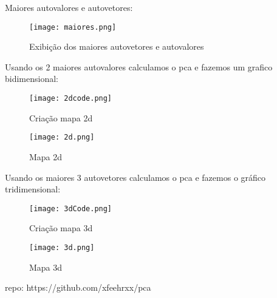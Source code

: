 \documentclass{article}
\begin{document}
Maiores autovalores e autovetores:

\begin{figure}[H]
    \centering
    \texttt{[image: maiores.png]}
    \caption{Exibição dos maiores autovetores e autovalores}
    \label{fig:autovalores}
\end{figure}

Usando os 2 maiores autovalores calculamos o pca e fazemos um grafico bidimensional:

\begin{figure}[H]
    \centering
    \texttt{[image: 2dcode.png]}
    \caption{Criação mapa 2d}
    \label{fig:autovalores}
\end{figure}

\begin{figure}[H]
    \centering
    \texttt{[image: 2d.png]}
    \caption{Mapa 2d}
    \label{fig:autovalores}
\end{figure}

Usando os maiores 3 autovetores calculamos o pca e fazemos o gráfico tridimensional: 

\begin{figure}[H]
    \centering
    \texttt{[image: 3dCode.png]}
    \caption{Criação mapa 3d}
    \label{fig:autovalores}
\end{figure}

\begin{figure}[H]
    \centering
    \texttt{[image: 3d.png]}
    \caption{Mapa 3d}
    \label{fig:autovalores}
\end{figure}
   repo: https://github.com/xfeehrxx/pca
\end{document}
